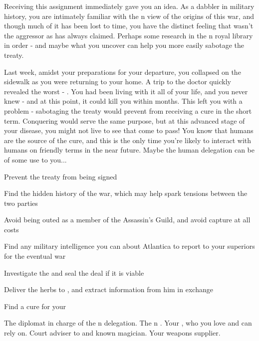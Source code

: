 \documentclass[char]{NeptuneBall}
\begin{document}
Receiving this assignment immediately gave you an idea. As a dabbler in military history, you are intimately familiar with the \pPacifica{}n view of the origins of this war, and though much of it has been lost to time, you have the distinct feeling that \pPacifica{} wasn't the aggressor as \pAtlantis{} has always claimed. Perhaps some research in the \pAtlantis{}n royal library in order - and maybe what you uncover can help you more easily sabotage the treaty.

Last week, amidst your preparations for your departure, you collapsed on the sidewalk as you were returning to your home. A trip to the doctor quickly revealed the worst - \pPolio{}. You had been living with it all of your life, and you never knew - and at this point, it could kill you within months. This left you with a problem - sabotaging the treaty would prevent \pPacifica{} from receiving a cure in the short term. Conquering \pAtlantis{} would serve the same purpose, but at this advanced stage of your disease, you might not live to see that come to pass! You know that humans are the source of the cure, and this is the only time you're likely to interact with humans on friendly terms in the near future. Maybe the human delegation can be of some use to you...

\begin{itemz}[Goals]
	\item Prevent the treaty from being signed
	\item Find the hidden history of the war, which may help spark tensions between the two parties
	\item Avoid being outed as a member of the Assassin's Guild, and avoid capture at all costs
  \item Find any military intelligence you can about Atlantica to report to your superiors for the eventual war
	\item Investigate the \iPrototype{} and seal the deal if it is viable
	\item Deliver the herbs to \cManta{}, and extract information from him in exchange
	\item Find a cure for your \pPolio{}

\end{itemz}

\begin{contacts}
	\contact{\cDiplomat{}} The diplomat in charge of the \pPacifica{}n delegation.
	\contact{\cPrince{}} The \pPacifica{}n \cPrince{\Prince}.
  \contact{\cBodyguard{}} Your \cSpy{\sibling}, who you love and can rely on.
	\contact{\cManta{}} Court adviser to \cKing{\King} \cKing{} and known magician.
	\contact{\cGeneral{}} Your weapons supplier.
\end{contacts}
\end{document}
